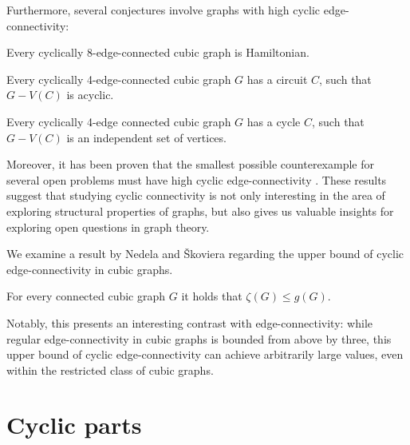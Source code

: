 \documentclass[12pt, twoside]{book}
\begin{document}
Furthermore, several conjectures involve graphs with high cyclic edge-connectivity:

\begin{conjecture}
	Every cyclically $8$-edge-connected cubic graph is Hamiltonian.
\end{conjecture}

\begin{conjecture}
	Every cyclically 4-edge-connected cubic graph $G$ has a circuit $C$, such that $G-V (C)$ is acyclic.
\end{conjecture}

\begin{conjecture}
	Every cyclically 4-edge connected cubic graph $G$ has a cycle $C$, such that $G-V(C)$ is an independent set of vertices.
\end{conjecture}

Moreover, it has been proven that the smallest possible counterexample for several open problems must have high cyclic edge-connectivity \cite{Macajova2020, Kochol2004}. These results suggest that studying cyclic connectivity is not only interesting in the area of exploring structural properties of graphs, but also gives us valuable insights for exploring open questions in graph theory.


We examine a result by Nedela and Škoviera regarding the upper bound of cyclic edge-connectivity in cubic graphs. 

\begin{proposition}\label{prop:cyclic-con-less-than-girth}
	For every connected cubic graph $G$ it holds that $\zeta(G)\leq g(G)$.
\end{proposition}

Notably, this presents an interesting contrast with edge-connectivity: while regular edge-connectivity in cubic graphs is bounded from above by three, this upper bound of cyclic edge-connectivity can achieve arbitrarily large values, even within the restricted class of cubic graphs.

\section{Cyclic parts}\label{sec:cyclic-parts}
\end{document}
